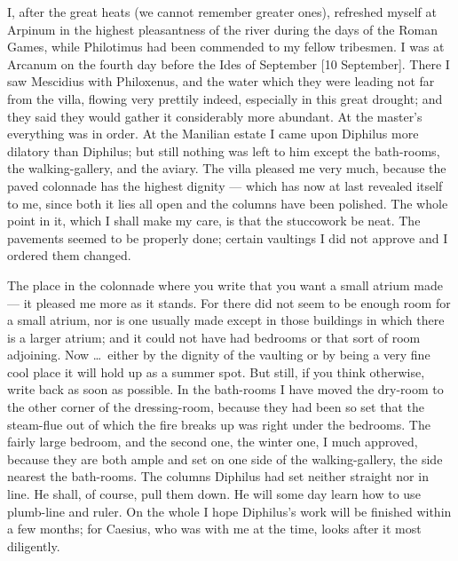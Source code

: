 

 I, after the great heats (we cannot remember greater ones), refreshed myself at Arpinum in the highest pleasantness of the river during the days of the Roman Games, while Philotimus had been commended to my fellow tribesmen. I was at Arcanum on the fourth day before the Ides of September [10 September]. There I saw Mescidius with Philoxenus, and the water which they were leading not far from the villa, flowing very prettily indeed, especially in this great drought; and they said they would gather it considerably more abundant. At the master's everything was in order. At the Manilian estate I came upon Diphilus more dilatory than Diphilus; but still nothing was left to him except the bath-rooms, the walking-gallery, and the aviary. The villa pleased me very much, because the paved colonnade has the highest dignity --- which has now at last revealed itself to me, since both it lies all open and the columns have been polished. The whole point in it, which I shall make my care, is that the stuccowork be neat. The pavements seemed to be properly done; certain vaultings I did not approve and I ordered them changed.

 The place in the colonnade where you write that you want a small atrium made --- it pleased me more as it stands. For there did not seem to be enough room for a small atrium, nor is one usually made except in those buildings in which there is a larger atrium; and it could not have had bedrooms or that sort of room adjoining. Now \dots\ either by the dignity of the vaulting or by being a very fine cool place it will hold up as a summer spot. But still, if you think otherwise, write back as soon as possible. In the bath-rooms I have moved the dry-room to the other corner of the dressing-room, because they had been so set that the steam-flue out of which the fire breaks up was right under the bedrooms. The fairly large bedroom, and the second one, the winter one, I much approved, because they are both ample and set on one side of the walking-gallery, the side nearest the bath-rooms. The columns Diphilus had set neither straight nor in line. He shall, of course, pull them down. He will some day learn how to use plumb-line and ruler. On the whole I hope Diphilus's work will be finished within a few months; for Caesius, who was with me at the time, looks after it most diligently.

